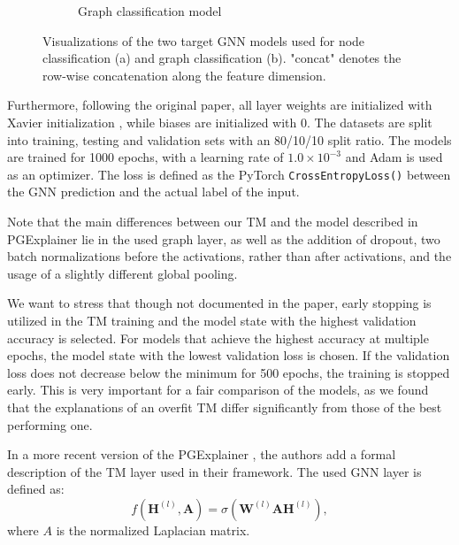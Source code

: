 \begin{figure}[htbp]
\begin{subfigure}[t]{0.48\textwidth}
\begin{tikzpicture}
        \end{tikzpicture}
        \caption{Graph classification model}
        \label{fig:graph-classification}
    \end{subfigure}
    \caption[Visualization of used target models]{Visualizations of the two target GNN models used for node classification (a) and graph classification (b). "concat" denotes the row-wise concatenation along the feature dimension.}
    \label{fig:gnn-models}
\end{figure}

Furthermore, following the original paper, all layer weights are initialized with Xavier initialization \cite{glorot2010understanding}, while biases are initialized with $0$. The datasets are split into training, testing and validation sets with an 80/10/10 split ratio. The models are trained for 1000 epochs, with a learning rate of $1.0 \times 10^{-3}$ and Adam \cite{kingma2014adam} is used as an optimizer. The loss is defined as the PyTorch \lstinline|CrossEntropyLoss()| between the GNN prediction and the actual label of the input. \bigskip

Note that the main differences between our \ac{TM} and the model described in PGExplainer \cite{luo2020parameterized} lie in the used graph layer, as well as the addition of dropout, two batch normalizations before the activations, rather than after activations, and the usage of a slightly different global pooling.

We want to stress that though not documented in the paper, early stopping is utilized in the \ac{TM} training and the model state with the highest validation accuracy is selected. For models that achieve the highest accuracy at multiple epochs, the model state with the lowest validation loss is chosen. If the validation loss does not decrease below the minimum for 500 epochs, the training is stopped early. This is very important for a fair comparison of the models, as we found that the explanations of an overfit \ac{TM} differ significantly from those of the best performing one.\bigskip

In a more recent version of the PGExplainer \cite{10423141}, the authors add a formal description of the \ac{TM} layer used in their framework. The used GNN layer is defined as:
\begin{equation}
    f(\mathbf{H}^{(l)},\mathbf{A})=\sigma(\mathbf{W}^{(l)}\mathbf{A}\mathbf{H}^{(l)}),
\end{equation}
where $A$ is the normalized Laplacian matrix.

